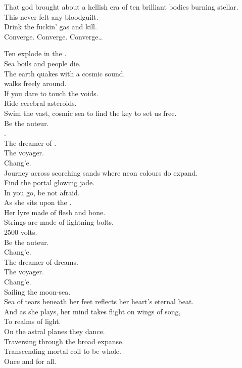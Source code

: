 That god brought about a hellish era of ten brilliant bodies burning stellar. \\
This  never felt any bloodguilt. \\
Drink the fuckin' gas and kill. \\

Converge. Converge. Converge… \\



Ten  explode in the . \\
Sea boils and people die. \\
The earth quakes with a cosmic sound. \\
 walks freely around. \\
If you dare to touch the voids. \\
Ride cerebral asteroids. \\
Swim the vast, cosmic sea to find the key to set us free. \\

Be the auteur. \\
. \\
The dreamer of . \\
The voyager. \\
Chang'e. \\

Journey across scorching sands where neon colours do expand. \\
Find the portal glowing jade. \\
In you go, be not afraid. \\
As she sits upon the . \\
Her lyre made of flesh and bone. \\
Strings are made of lightning bolts. \\
2500 volts. \\

Be the auteur. \\
Chang'e. \\
The dreamer of dreams. \\
The voyager. \\
Chang'e. \\
Sailing the moon-sea. \\

Sea of tears beneath her feet reflects her heart's eternal beat. \\
And as she plays, her mind takes flight on wings of song, \\
To realms of light. \\
On the astral planes they dance. \\
Traversing through the broad expanse. \\
Transcending mortal coil to be whole. \\
Once and for all. \\

